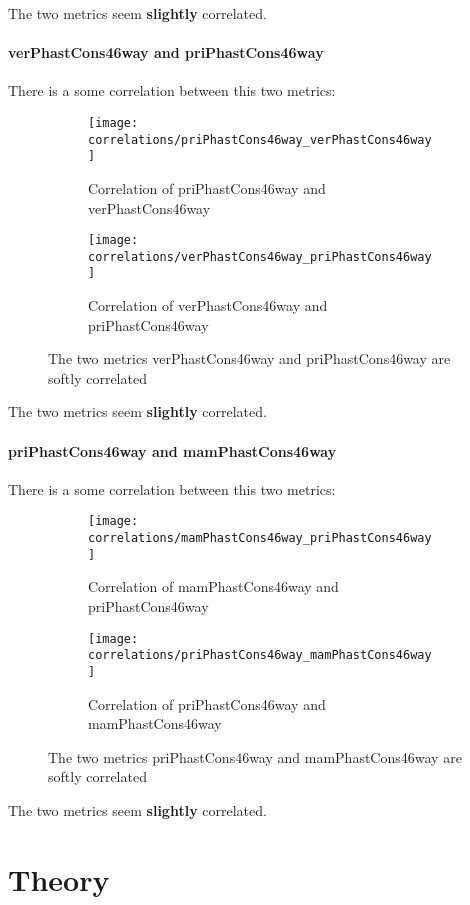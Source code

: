 The two metrics seem \textbf{slightly} correlated.

\subsection{verPhastCons46way and priPhastCons46way}
There is a some correlation between this two metrics:

\begin{figure}
	\begin{subfigure}{0.3\textwidth}
		\texttt{[image: correlations/priPhastCons46way\_verPhastCons46way]}
		\caption{Correlation of priPhastCons46way and verPhastCons46way}
	\end{subfigure}
	\begin{subfigure}{0.3\textwidth}
		\texttt{[image: correlations/verPhastCons46way\_priPhastCons46way]}
		\caption{Correlation of verPhastCons46way and priPhastCons46way}
	\end{subfigure}
	\caption{The two metrics verPhastCons46way and priPhastCons46way are softly correlated}
\end{figure}

The two metrics seem \textbf{slightly} correlated.

\subsection{priPhastCons46way and mamPhastCons46way}
There is a some correlation between this two metrics:

\begin{figure}
	\begin{subfigure}{0.3\textwidth}
		\texttt{[image: correlations/mamPhastCons46way\_priPhastCons46way]}
		\caption{Correlation of mamPhastCons46way and priPhastCons46way}
	\end{subfigure}
	\begin{subfigure}{0.3\textwidth}
		\texttt{[image: correlations/priPhastCons46way\_mamPhastCons46way]}
		\caption{Correlation of priPhastCons46way and mamPhastCons46way}
	\end{subfigure}
	\caption{The two metrics priPhastCons46way and mamPhastCons46way are softly correlated}
\end{figure}

The two metrics seem \textbf{slightly} correlated.

\part{Theory}
